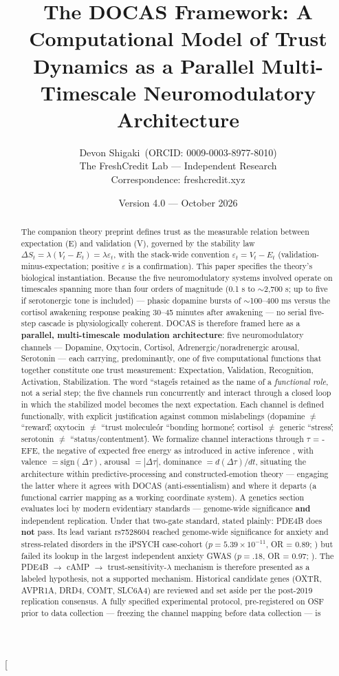 \documentclass[11pt,twocolumn]{article}
\title{The DOCAS Framework: A Computational Model of Trust Dynamics as a Parallel Multi-Timescale Neuromodulatory Architecture}
\author{Devon Shigaki~(ORCID: 0009-0003-8977-8010)\\
\small The FreshCredit Lab --- Independent Research\\
\small Correspondence: freshcredit.xyz}
\date{\small Version 4.0 --- October 2026}
\theoremstyle{plain}
\begin{document}
\twocolumn[{%
\maketitle
\begin{abstract}
The companion theory preprint defines trust as the measurable relation between expectation (E) and validation (V), governed by the stability law $\Delta S_t = \lambda(V_t - E_t) = \lambda\varepsilon_t$, with the stack-wide convention $\varepsilon_t = V_t - E_t$ (validation-minus-expectation; positive $\varepsilon$ is a confirmation). This paper specifies the theory's biological instantiation. Because the five neuromodulatory systems involved operate on timescales spanning more than four orders of magnitude (0.1 s to $\sim$2,700 s; up to five if serotonergic tone is included) — phasic dopamine bursts of $\sim$100–400 ms versus the cortisol awakening response peaking 30–45 minutes after awakening — no serial five-step cascade is physiologically coherent. DOCAS is therefore framed here as a \textbf{parallel, multi-timescale modulation architecture}: five neuromodulatory channels — Dopamine, Oxytocin, Cortisol, Adrenergic/noradrenergic arousal, Serotonin — each carrying, predominantly, one of five computational functions that together constitute one trust measurement: Expectation, Validation, Recognition, Activation, Stabilization. The word ``stage\'\' is retained as the name of a \textit{functional role}, not a serial step; the five channels run concurrently and interact through a closed loop in which the stabilized model becomes the next expectation. Each channel is defined functionally, with explicit justification against common mislabelings (dopamine $\neq$ ``reward\'\'; oxytocin $\neq$ ``trust molecule\'\' or ``bonding hormone\'\'; cortisol $\neq$ generic ``stress\'\'; serotonin $\neq$ ``status/contentment\'\'). We formalize channel interactions through $\tau$ = -EFE, the negative of expected free energy as introduced in active inference \citep{friston2015,friston2017}, with valence $= \mathrm{sign}(\Delta\tau)$, arousal $= |\Delta\tau|$, dominance $= d(\Delta\tau)/dt$, situating the architecture within predictive-processing and constructed-emotion theory — engaging the latter where it agrees with DOCAS (anti-essentialism) and where it departs (a functional carrier mapping as a working coordinate system). A genetics section evaluates loci by modern evidentiary standards — genome-wide significance \textbf{and} independent replication. Under that two-gate standard, stated plainly: PDE4B does \textbf{not} pass. Its lead variant rs7528604 reached genome-wide significance for anxiety and stress-related disorders in the iPSYCH case-cohort ($p = 5.39 \times 10^{-11}$, OR = 0.89; \citealp{meier2019}) but failed its lookup in the largest independent anxiety GWAS ($p = .18$, OR = 0.97; \citealp{purves2020}). The PDE4B $\to$ cAMP $\to$ trust-sensitivity-$\lambda$ mechanism is therefore presented as a labeled hypothesis, not a supported mechanism. Historical candidate genes (OXTR, AVPR1A, DRD4, COMT, SLC6A4) are reviewed and set aside per the post-2019 replication consensus. A fully specified experimental protocol, pre-registered on OSF prior to data collection — freezing the channel mapping before data collection — is 
\end{abstract}}
\end{document}
